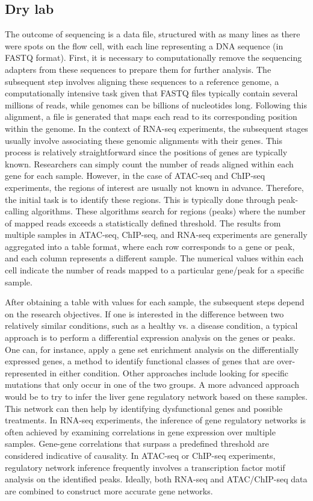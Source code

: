 \subsection{Dry lab}

The outcome of sequencing is a data file, structured with as many lines as there were spots on the flow cell, with each line representing a DNA sequence (in FASTQ format). First, it is necessary to computationally remove the sequencing adapters from these sequences to prepare them for further analysis. The subsequent step involves aligning these sequences to a reference genome, a computationally intensive task given that FASTQ files typically contain several millions of reads, while genomes can be billions of nucleotides long. Following this alignment, a file is generated that maps each read to its corresponding position within the genome. In the context of RNA-seq experiments, the subsequent stages usually involve associating these genomic alignments with their genes. This process is relatively straightforward since the positions of genes are typically known. Researchers can simply count the number of reads aligned within each gene for each sample. However, in the case of ATAC-seq and ChIP-seq experiments, the regions of interest are usually not known in advance. Therefore, the initial task is to identify these regions. This is typically done through peak-calling algorithms\cite{Zhang2008,Stovner2019,Tarbell2019}. These algorithms search for regions (peaks) where the number of mapped reads exceeds a statistically defined threshold. The results from multiple samples in ATAC-seq, ChIP-seq, and RNA-seq experiments are generally aggregated into a table format, where each row corresponds to a gene or peak, and each column represents a different sample. The numerical values within each cell indicate the number of reads mapped to a particular gene/peak for a specific sample.

After obtaining a table with values for each sample, the subsequent steps depend on the research objectives. If one is interested in the difference between two relatively similar conditions, such as a healthy vs. a disease condition, a typical approach is to perform a differential expression analysis on the genes or peaks\cite{deseq2}.  One can, for instance, apply a gene set enrichment analysis on the differentially expressed genes, a method to identify functional classes of genes that are over-represented in either condition. Other approaches include looking for specific mutations that only occur in one of the two groups. A more advanced approach would be to try to infer the liver gene regulatory network based on these samples. This network can then help by identifying dysfunctional genes and possible treatments. In RNA-seq experiments, the inference of gene regulatory networks is often achieved by examining correlations in gene expression over multiple samples. Gene-gene correlations that surpass a predefined threshold are considered indicative of causality. In ATAC-seq or ChIP-seq experiments, regulatory network inference frequently involves a transcription factor motif analysis on the identified peaks. Ideally, both RNA-seq and ATAC/ChIP-seq data are combined to construct more accurate gene networks.


